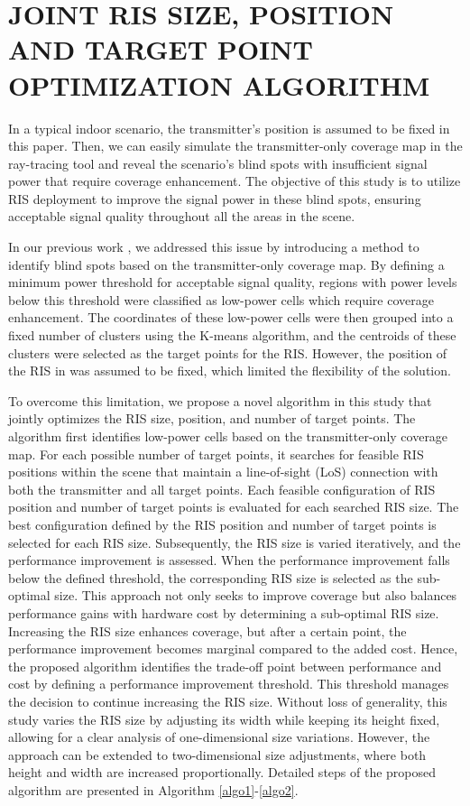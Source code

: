 \documentclass{IEEEoj}
\begin{document}
\section{JOINT RIS SIZE, POSITION AND TARGET POINT OPTIMIZATION ALGORITHM} \label{algo_section}
In a typical indoor scenario, the transmitter's position is assumed to be fixed in this paper. Then, we can easily simulate the transmitter-only coverage map in the ray-tracing tool and reveal the scenario's blind spots with insufficient signal power that require coverage enhancement. The objective of this study is to utilize RIS deployment to improve the signal power in these blind spots, ensuring acceptable signal quality throughout all the areas in the scene.

In our previous work \cite{emre_claude_eucap_paper}, we addressed this issue by introducing a method to identify blind spots based on the transmitter-only coverage map. By defining a minimum power threshold for acceptable signal quality, regions with power levels below this threshold were classified as low-power cells which require coverage enhancement. The coordinates of these low-power cells were then grouped into a fixed number of clusters using the K-means algorithm, and the centroids of these clusters were selected as the target points for the RIS. However, the position of the RIS in \cite{emre_claude_eucap_paper} was assumed to be fixed, which limited the flexibility of the solution.

To overcome this limitation, we propose a novel algorithm in this study that jointly optimizes the RIS size, position, and number of target points. The algorithm first identifies low-power cells based on the transmitter-only coverage map. For each possible number of target points, it searches for feasible RIS positions within the scene that maintain a line-of-sight (LoS) connection with both the transmitter and all target points. Each feasible configuration of RIS position and number of target points is evaluated for each searched RIS size. The best configuration defined by the RIS position and number of target points is selected for each RIS size. Subsequently, the RIS size is varied iteratively, and the performance improvement is assessed. When the performance improvement falls below the defined threshold, the corresponding RIS size is selected as the sub-optimal size. This approach not only seeks to improve coverage but also balances performance gains with hardware cost by determining a sub-optimal RIS size. Increasing the RIS size enhances coverage, but after a certain point, the performance improvement becomes marginal compared to the added cost. Hence, the proposed algorithm identifies the trade-off point between performance and cost by defining a performance improvement threshold. This threshold manages the decision to continue increasing the RIS size. Without loss of generality, this study varies the RIS size by adjusting its width while keeping its height fixed, allowing for a clear analysis of one-dimensional size variations. However, the approach can be extended to two-dimensional size adjustments, where both height and width are increased proportionally. Detailed steps of the proposed algorithm are presented in Algorithm \ref{algo1}-\ref{algo2}.
\end{document}
